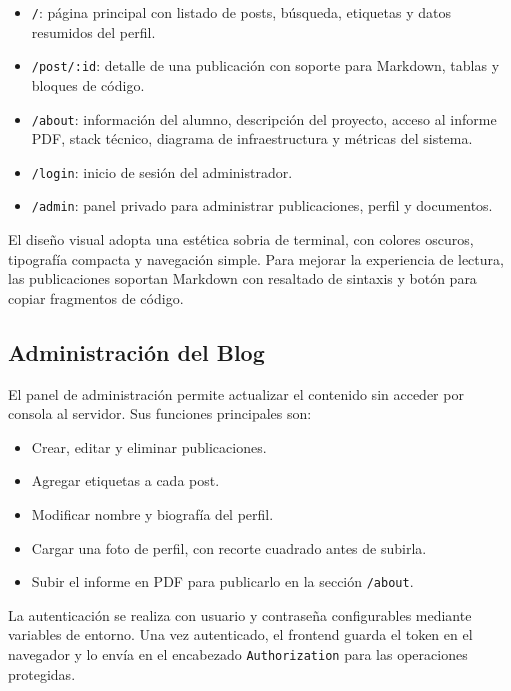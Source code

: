 \documentclass[twoside, 11pt, a4paper]{article}
\begin{document}
    \begin{itemize}
        \item \texttt{/}: página principal con listado de posts, búsqueda, etiquetas y datos resumidos del perfil.
        \item \texttt{/post/:id}: detalle de una publicación con soporte para Markdown, tablas y bloques de código.
        \item \texttt{/about}: información del alumno, descripción del proyecto, acceso al informe PDF, stack técnico, diagrama de infraestructura y métricas del sistema.
        \item \texttt{/login}: inicio de sesión del administrador.
        \item \texttt{/admin}: panel privado para administrar publicaciones, perfil y documentos.
    \end{itemize}

    El diseño visual adopta una estética sobria de terminal, con colores oscuros, tipografía compacta y navegación simple. Para mejorar la experiencia de lectura, las publicaciones soportan Markdown con resaltado de sintaxis y botón para copiar fragmentos de código.

    \subsection{Administración del Blog}

    El panel de administración permite actualizar el contenido sin acceder por consola al servidor. Sus funciones principales son:

    \begin{itemize}
        \item Crear, editar y eliminar publicaciones.
        \item Agregar etiquetas a cada post.
        \item Modificar nombre y biografía del perfil.
        \item Cargar una foto de perfil, con recorte cuadrado antes de subirla.
        \item Subir el informe en PDF para publicarlo en la sección \texttt{/about}.
    \end{itemize}

    La autenticación se realiza con usuario y contraseña configurables mediante variables de entorno. Una vez autenticado, el frontend guarda el token en el navegador y lo envía en el encabezado \texttt{Authorization} para las operaciones protegidas.
\end{document}
